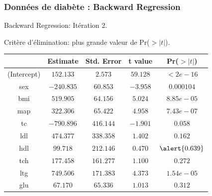 \begin{frame}
\frametitle{Données de diabète : Backward Regression}

\centerline\alert{Backward Regression: Itération 2.}


\begin{center}

\alert{Critère d'élimination: plus grande valeur de}
Pr($>|t|$).

\vspace{4mm}

{\small
\begin{tabular}{|c||c|c|c|c|}
\hline &Estimate&Std. Error&t value&Pr($>|t|$)\\\hline (Intercept)
&$152.133$&$2.573$&$59.128$&$< 2e-16$
\\\hline
sex &$-240.835$&$60.853$&$-3.958$&$0.000104$\\
bmi&$519.905$&$64.156$&$5.024$&$8.85e-05$\\\hline
map&$322.306$&$65.422$&$4.958$&$7.43e-07$\\
tc&$-790.896$&$416.144$&$-1.901$&$0.058$\\\hline
ldl&$474.377$&$338.358$&$1.402$&$0.162$\\
\alert{ hdl}&$99.718$&$212.146 $&$0.470$&$\alert{
0.639}$\\\hline
tch&$177.458$&$161.277$&$ 1.100$&$0.272$\\
ltg&$749.506$&$ 171.383$&$4.373$&$ 1.54e-05$\\\hline glu&$67.170$&$
65.336$&$1.013$&$0.312$\\\hline
\end{tabular}
}
\end{center}
\end{frame}

